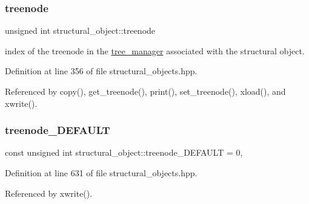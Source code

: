 \mbox{\label{classstructural__object_a2907697d982702311dcbcef8c0e1d3f4}} 
\subsubsection{\texorpdfstring{treenode}{treenode}}
{\footnotesize\ttfamily unsigned int structural\+\_\+object\+::treenode\hspace{0.3cm}{\ttfamily [private]}}



index of the treenode in the \hyperlink{classtree__manager}{tree\+\_\+manager} associated with the structural object. 



Definition at line 356 of file structural\+\_\+objects.\+hpp.



Referenced by copy(), get\+\_\+treenode(), print(), set\+\_\+treenode(), xload(), and xwrite().

\mbox{\label{classstructural__object_a6db33090a23013b99dc89c70a93aef46}} 
\subsubsection{\texorpdfstring{treenode\+\_\+\+D\+E\+F\+A\+U\+LT}{treenode\_DEFAULT}}
{\footnotesize\ttfamily const unsigned int structural\+\_\+object\+::treenode\+\_\+\+D\+E\+F\+A\+U\+LT = 0\hspace{0.3cm}{\ttfamily [static]}, {\ttfamily [private]}}



Definition at line 631 of file structural\+\_\+objects.\+hpp.



Referenced by xwrite().

\mbox{\label{classstructural__object_a9a7159ce4c8da9984f256d9032f49778}} 
